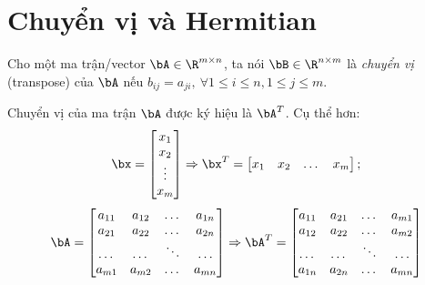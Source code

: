 \section{Chuyển vị và Hermitian} %
\label{sec:chuyen_vi}


Cho một ma trận/vector $\bA \in \R^{m\times n}$, ta nói $\bB \in \R^{n\times m}$ là \textit{chuyển vị} (transpose) của
$\bA$ nếu $b_{ij} = a_{ji},~\forall 1 \leq i \leq n, 1 \leq j\leq m$.

Chuyển vị của ma trận $\bA$ được ký hiệu là $\bA^T$. Cụ thể hơn:
\begin{eqnarray*}
    \bx = \left[
    \begin{matrix}
        x_1 \\ x_2 \\ \vdots \\ x_m
    \end{matrix}
    \right] \Rightarrow \bx^T = \left[
\begin{matrix}
x_1 & x_2 & \dots & x_m
\end{matrix}
\right];
\end{eqnarray*}
\begin{eqnarray*}
\bA = \left[
\begin{matrix}
    a_{11} & a_{12} & \dots & a_{1n} \\
    a_{21} & a_{22} & \dots & a_{2n} \\
    \dots & \dots & \ddots & \dots \\
    a_{m1} & a_{m2} & \dots & a_{mn}
\end{matrix}
\right]
\Rightarrow
\bA^T = \left[
\begin{matrix}
a_{11} & a_{21}  &\dots & a_{m1} \\
a_{12} & a_{22}  & \dots & a_{m2} \\
\dots & \dots &  \ddots & \dots \\
a_{1n} & a_{2n} & \dots & a_{mn}
\end{matrix}
\right]
\end{eqnarray*}
